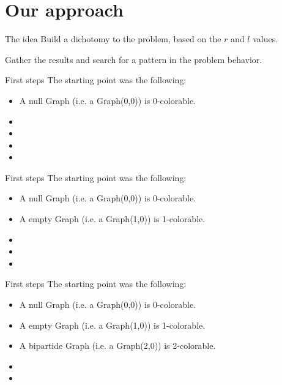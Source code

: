 \documentclass[9pt, compress]{beamer}
\begin{document}
    \section{Our approach}
    \begin{frame}{The idea}
      Build a dichotomy to the problem, based on the $r$ and $l$ values.
      
      Gather the results and search for a pattern in the problem behavior.
    \end{frame}
    \begin{frame}{First steps}
      The starting point was the following:
      \begin{itemize}
        \item A null Graph (i.e. a Graph(0,0)) is 0-colorable.
        \item 
        \item 
        \item 
         \item                                                                                                                
      \end{itemize}
    \end{frame}
    \begin{frame}{First steps}
      The starting point was the following:
      \begin{itemize}
        \item A null Graph (i.e. a Graph(0,0)) is 0-colorable.
        \item A empty Graph (i.e. a Graph(1,0)) is 1-colorable.
        \item 
        \item 
         \item                                                                                                                
      \end{itemize}
    \end{frame}
    \begin{frame}{First steps}
      The starting point was the following:
      \begin{itemize}
        \item A null Graph (i.e. a Graph(0,0)) is 0-colorable.
        \item A empty Graph (i.e. a Graph(1,0)) is 1-colorable.
        \item A bipartide Graph (i.e. a Graph(2,0)) is 2-colorable.
        \item 
         \item                                                                                                                
      \end{itemize}
    \end{frame}
\end{document}
